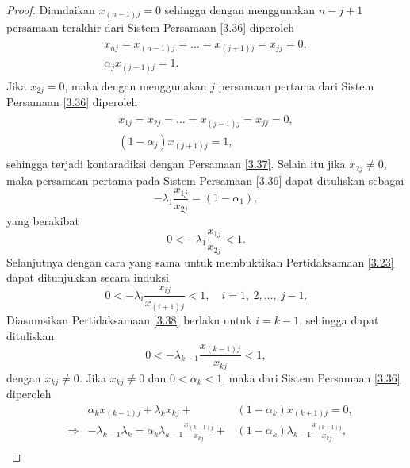 \begin{proof}
    Diandaikan $x_{(n-1)j} = 0$ sehingga dengan menggunakan $n-j+1$ persamaan terakhir dari Sistem Persamaan \eqref{3.36} diperoleh
    \begin{align}\label{3.37}
    \begin{split}
        x_{nj} = x_{(n-1)j} = \dots = x_{(j+1)j} = x_{jj} = 0,\\
        \alpha_jx_{(j-1)j} = 1.
    \end{split}
    \end{align}
    Jika $x_{2j} = 0$, maka dengan menggunakan $j$ persamaan pertama dari Sistem Persamaan \eqref{3.36} diperoleh
    \begin{align}\label{x2eq0}
    \begin{split}
        x_{1j} = x_{2j} = \dots = x_{(j-1)j} = x_{jj} = 0,\\
        (1 - \alpha_j)x_{(j+1)j} = 1,
    \end{split}
    \end{align}
    sehingga terjadi kontaradiksi dengan Persamaan \eqref{3.37}. Selain itu jika $x_{2j} \neq 0$, maka persamaan pertama pada Sistem Persamaan \eqref{3.36} dapat dituliskan sebagai
    \begin{equation*}
        -\lambda_1\frac{x_{1j}}{x_{2j}} = (1 - \alpha_1),
    \end{equation*}
    yang berakibat
    \begin{equation*}
        0 < -\lambda_1\frac{x_{1j}}{x_{2j}} < 1.
    \end{equation*}
    Selanjutnya dengan cara yang sama untuk membuktikan Pertidaksamaan \eqref{3.23} dapat ditunjukkan secara induksi
    \begin{equation}
        0 < -\lambda_i\frac{x_{ij}}{x_{(i+1)j}} < 1, \quad i=1,~2,\dots,~j-1. \label{3.38}
    \end{equation}
    Diasumsikan Pertidaksamaan \eqref{3.38} berlaku untuk $i=k-1$, sehingga dapat dituliskan
    \begin{equation*}
        0 < -\lambda_{k-1}\frac{x_{(k-1)j}}{x_{kj}} < 1,
    \end{equation*}
    dengan $x_{kj} \neq 0$. Jika $x_{kj} \neq 0$ dan $0<\alpha_k<1$, maka dari Sistem Persamaan \eqref{3.36} diperoleh
    \begin{align*}
         &&\alpha_kx_{(k-1)j} + \lambda_kx_{kj} +& (1 - \alpha_k)x_{(k+1)j} = 0, \\
         &\Longrightarrow&-\lambda_{k-1}\lambda_{k}=\alpha_k\lambda_{k-1}\frac{x_{(k-1)j}}{x_{kj}} +& (1 - \alpha_k)\lambda_{k-1}\frac{x_{(k+1)j}}{x_{kj}}, \\

\end{align*}
\end{proof}
